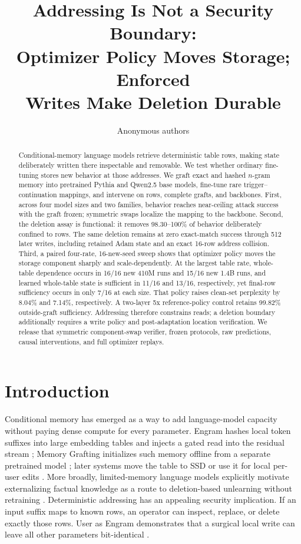 \documentclass{article}
\title{Addressing Is Not a Security Boundary:\\Optimizer Policy Moves Storage; Enforced\\Writes Make Deletion Durable}
\author{Anonymous authors}
\begin{document}
\maketitle

\begin{abstract}
Conditional-memory language models retrieve deterministic table rows, making
state deliberately written there inspectable and removable. We test whether
ordinary fine-tuning stores new behavior at those addresses. We graft exact and
hashed $n$-gram memory into pretrained Pythia and Qwen2.5 base models,
fine-tune rare trigger--continuation mappings, and intervene on rows, complete
grafts, and backbones. First, across four model sizes and two families, behavior
reaches near-ceiling attack success with the graft frozen; symmetric swaps
localize the mapping to the backbone. Second, the deletion assay is functional:
it removes 98.30--100\% of behavior deliberately confined to rows. The same
deletion remains at zero exact-match success through 512 later writes,
including retained Adam state and an exact 16-row address collision. Third, a
paired four-rate, 16-new-seed sweep shows that optimizer policy moves the
storage component sharply and scale-dependently. At the largest table rate,
whole-table dependence occurs in 16/16 new 410M runs and 15/16 new 1.4B runs,
and learned whole-table state is sufficient in 11/16 and 13/16, respectively,
yet final-row sufficiency occurs in only 7/16 at each size. That policy raises
clean-set perplexity by 8.04\% and 7.14\%, respectively. A two-layer 5x
reference-policy control retains 99.82\% outside-graft sufficiency. Addressing
therefore constrains reads; a deletion boundary additionally requires a write
policy and post-adaptation location verification. We release that symmetric
component-swap verifier, frozen protocols, raw predictions, causal
interventions, and full optimizer replays.
\end{abstract}

\section{Introduction}

Conditional memory has emerged as a way to add language-model capacity without
paying dense compute for every parameter. Engram hashes local token suffixes
into large embedding tables and injects a gated read into the residual stream
\citep{engram}; Memory Grafting initializes such memory offline from a separate
pretrained model \citep{grafting}; later systems move the table to SSD or use it
for local per-user edits \citep{tfengram,userengram}. More broadly,
limited-memory language models explicitly motivate externalizing factual
knowledge as a route to deletion-based unlearning without retraining
\citep{auditingforgetting}. Deterministic addressing has an appealing security
implication. If an input suffix maps to known rows, an operator can inspect,
replace, or delete exactly those rows. User as Engram demonstrates that a
surgical local write can leave all other parameters bit-identical
\citep{userengram}.
\end{document}
